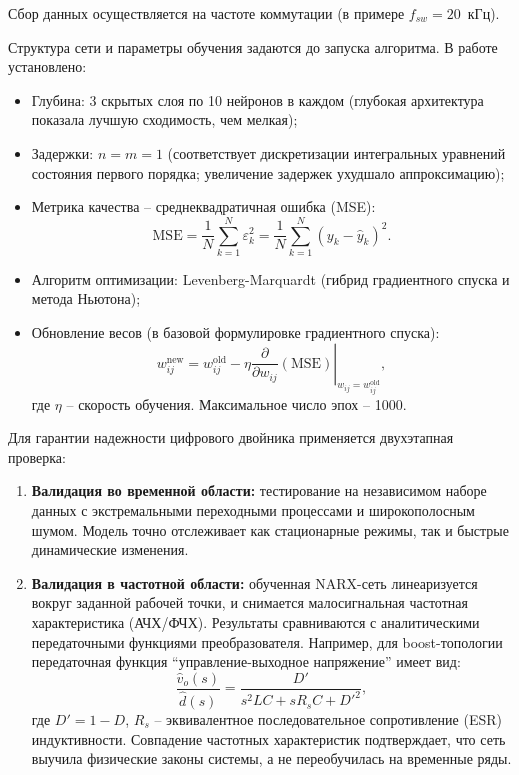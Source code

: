Сбор данных осуществляется на частоте коммутации (в примере ${f_{sw} = 20}$~кГц).

Структура сети и параметры обучения задаются до запуска алгоритма. В работе установлено:
\begin{itemize}[leftmargin=*]
    \item Глубина: 3 скрытых слоя по 10 нейронов в каждом (глубокая архитектура показала лучшую сходимость, чем мелкая);
    \item Задержки: ${n = m = 1}$ (соответствует дискретизации интегральных уравнений состояния первого порядка; увеличение задержек ухудшало аппроксимацию);
    \item Метрика качества -- среднеквадратичная ошибка (MSE):
    \begin{equation}
        \text{MSE} = \frac{1}{N} \sum_{k=1}^{N} \varepsilon_k^2 = \frac{1}{N} \sum_{k=1}^{N} (y_k - \hat{y}_k)^2.
    \end{equation}
    \item Алгоритм оптимизации: Levenberg-Marquardt (гибрид градиентного спуска и метода Ньютона);
    \item Обновление весов (в базовой формулировке градиентного спуска):
    \begin{equation}
        w_{ij}^{\text{new}} = w_{ij}^{\text{old}} - \eta \left. \frac{\partial}{\partial w_{ij}} (\text{MSE}) \right|_{w_{ij}=w_{ij}^{\text{old}}},
    \end{equation}
    где $\eta$ -- скорость обучения. Максимальное число эпох -- 1000.
\end{itemize}

Для гарантии надежности цифрового двойника применяется двухэтапная проверка:
\begin{enumerate}[leftmargin=*]
    \item \textbf{Валидация во временной области:} тестирование на независимом наборе данных с экстремальными переходными процессами и широкополосным шумом. Модель точно отслеживает как стационарные режимы, так и быстрые динамические изменения.
    \item \textbf{Валидация в частотной области:} обученная NARX-сеть линеаризуется вокруг заданной рабочей точки, и снимается малосигнальная частотная характеристика (АЧХ/ФЧХ). Результаты сравниваются с аналитическими передаточными функциями преобразователя. Например, для boost-топологии передаточная функция \enquote{управление-выходное напряжение} имеет вид:
    \begin{equation}
        \frac{\hat{v}_o(s)}{\hat{d}(s)} = \frac{D'}{s^2 LC + s R_s C + D'^2},
    \end{equation}
    где $D' = 1-D$, $R_s$ -- эквивалентное последовательное сопротивление (ESR) индуктивности. Совпадение частотных характеристик подтверждает, что сеть выучила физические законы системы, а не переобучилась на временные ряды.
\end{enumerate}

